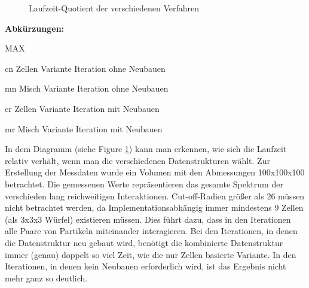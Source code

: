 \documentclass[
12pt,
a4paper,
BCOR10mm,
DIV14,
headsepline,
]{scrreprt}
\begin{document}
	\begin{figure}[h]
		\centering
		\caption{Laufzeit-Quotient der verschiedenen Verfahren}
		\label{figure:LaufzeitQuotient}
	\end{figure}
	\footnotesize\textbf{Abkürzungen:}\begin{labeling}[~--]{MAX}
		\item[cn] Zellen Variante Iteration ohne Neubauen
		\item[mn] Misch Variante Iteration ohne Neubauen
		\item[cr] Zellen Variante Iteration mit Neubauen
		\item[mr] Misch Variante Iteration mit Neubauen
	\end{labeling}
	In dem Diagramm (siehe Figure \ref{figure:LaufzeitQuotient}) kann man erkennen, wie sich die Laufzeit relativ verhält, wenn man die verschiedenen Datenstrukturen wählt. Zur Erstellung der Messdaten wurde ein Volumen mit den Abmessungen 100x100x100  betrachtet. Die gemessenen Werte repräsentieren das gesamte Spektrum der verschieden lang reichweitigen Interaktionen. Cut-off-Radien größer als 26 müssen nicht betrachtet werden, da Implementationsabhängig immer mindestens 9 Zellen (als 3x3x3 Würfel) existieren müssen. Dies führt dazu, dass in den Iterationen alle Paare von Partikeln miteinander interagieren. Bei den Iterationen, in denen die Datenstruktur neu gebaut wird, benötigt die kombinierte Datenstruktur immer (genau) doppelt so viel Zeit, wie die nur Zellen basierte Variante. In den Iterationen, in denen kein Neubauen erforderlich wird, ist das Ergebnis nicht mehr ganz so deutlich.
\end{document}
